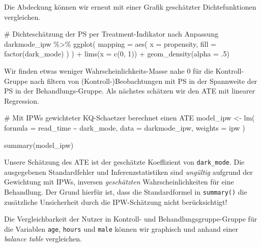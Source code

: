 \documentclass[
  a4paper,
  DIV=11,
  oneside]{scrreprt}
\newenvironment{Shaded}{\begin{snugshade}}{\end{snugshade}}
\newcommand{\NormalTok}[1]{\textcolor[rgb]{0.00,0.23,0.31}{#1}}
\begin{document}
Die Abdeckung können wir erneut mit einer Grafik geschätzter
Dichtefunktionen vergleichen.

\begin{Shaded}
\begin{Highlighting}[]
\NormalTok{\# Dichteschätzung der PS per Treatment{-}Indikator nach Anpassung}
\NormalTok{darkmode\_ipw \%\textgreater{}\%}
\NormalTok{  ggplot(}
\NormalTok{    mapping = aes(}
\NormalTok{      x = propensity, }
\NormalTok{      fill = factor(dark\_mode)}
\NormalTok{    )}
\NormalTok{  ) + }
\NormalTok{  lims(x = c(0, 1)) +}
\NormalTok{  geom\_density(alpha = .5)}
\end{Highlighting}
\end{Shaded}

Wir finden etwas weniger Wahrscheinlichkeits-Masse nahe 0 für die
Kontroll-Gruppe nach filtern von (Kontroll-)Beobachtungen mit PS in der
Spannweite der PS in der Behandlungs-Gruppe. Als nächstes schätzen wir
den ATE mit linearer Regression.

\begin{Shaded}
\begin{Highlighting}[]
\NormalTok{\# Mit IPWs gewichteter KQ{-}Schaetzer berechnet einen ATE}
\NormalTok{model\_ipw \textless{}{-} lm(}
\NormalTok{  formula = read\_time \textasciitilde{} dark\_mode, }
\NormalTok{  data = darkmode\_ipw,}
\NormalTok{  weights = ipw}
\NormalTok{)}

\NormalTok{summary(model\_ipw)}
\end{Highlighting}
\end{Shaded}

Unsere Schätzung des ATE ist der geschätzte Koeffizient von
\texttt{dark\_mode}. Die ausgegebenen Standardfehler und
Inferenzstatistiken sind \emph{ungültig} aufgrund der Gewichtung mit
IPWs, inversen \emph{geschätzten} Wahrscheinlichkeiten für eine
Behandlung. Der Grund hierfür ist, dass die Standardformel in
\texttt{summary()} die zusätzliche Unsicherheit durch die IPW-Schätzung
nicht berücksichtigt!

Die Vergleichbarkeit der Nutzer in Kontroll- und
Behandlungsgruppe-Gruppe für die Variablen \texttt{age}, \texttt{hours}
und \texttt{male} können wir graphisch und anhand einer \emph{balance
table} vergleichen.
\end{document}
